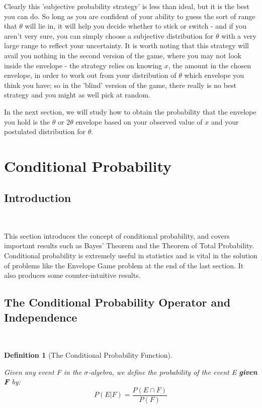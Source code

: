 \documentclass[12pt,a4paper]{article}
\newtheorem{defn}[thm]{Definition}
\begin{document}
Clearly this 'subjective probability strategy' is less than ideal, but it is the best you can do. So long as you are confident of your ability to guess the sort of range that $\theta$ will lie in, it will help you decide whether to stick or switch - and if you aren't very sure, you can simply choose a subjective distribution for $\theta$ with a very large range to reflect your uncertainty. It is worth noting that this strategy will avail you nothing in the second version of the game, where you may not look inside the envelope - the strategy relies on knowing $x$, the amount in the chosen envelope, in order to work out from your distribution of $\theta$ which envelope you think you have; so in the 'blind' version of the game, there really is no best strategy and you might as well pick at random.

In the next section, we will study how to obtain the probability that the envelope you hold is the $\theta$ or $2\theta$ envelope based on your observed value of $x$ and your postulated distribution for $\theta$.

\clearpage
\section{Conditional Probability}

\subsection{Introduction}$\;$

This section introduces the concept of conditional probability, and covers important results such as Bayes' Theorem and the Theorem of Total Probability. Conditional probability is extremely useful in statistics and is vital in the solution of problems like the Envelope Game problem at the end of the last section. It also produces some counter-intuitive results.

\subsection{The Conditional Probability Operator and Independence}\label{conditional and independence}$\;$
\begin{defn}[The Conditional Probability Function]$\;$\par
\vspace{12pt}

Given any event F in the $\sigma$-algebra, we define the probability of the event E {\bf given F} by:
$$P(E|F) = \frac{P(E \cap F)}{P(F)}$$
\end{defn}
\end{document}
